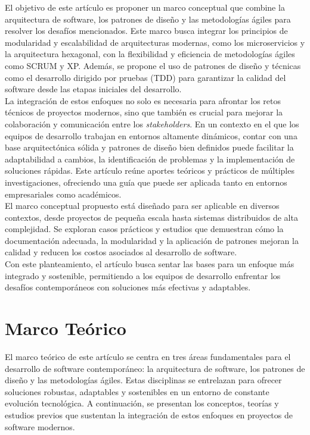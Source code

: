 \documentclass[conference]{IEEEtran}
\begin{document}
El objetivo de este artículo es proponer un marco conceptual que combine la arquitectura de software, los patrones de diseño y las metodologías ágiles para resolver los desafíos mencionados. Este marco busca integrar los principios de modularidad y escalabilidad de arquitecturas modernas, como los microservicios y la arquitectura hexagonal, con la flexibilidad y eficiencia de metodologías ágiles como SCRUM y XP. Además, se propone el uso de patrones de diseño y técnicas como el desarrollo dirigido por pruebas (TDD) para garantizar la calidad del software desde las etapas iniciales del desarrollo.\\

La integración de estos enfoques no solo es necesaria para afrontar los retos técnicos de proyectos modernos, sino que también es crucial para mejorar la colaboración y comunicación entre los \textit{stakeholders}. En un contexto en el que los equipos de desarrollo trabajan en entornos altamente dinámicos, contar con una base arquitectónica sólida y patrones de diseño bien definidos puede facilitar la adaptabilidad a cambios, la identificación de problemas y la implementación de soluciones rápidas. Este artículo reúne aportes teóricos y prácticos de múltiples investigaciones, ofreciendo una guía que puede ser aplicada tanto en entornos empresariales como académicos.\\

El marco conceptual propuesto está diseñado para ser aplicable en diversos contextos, desde proyectos de pequeña escala hasta sistemas distribuidos de alta complejidad. Se exploran casos prácticos y estudios que demuestran cómo la documentación adecuada, la modularidad y la aplicación de patrones mejoran la calidad y reducen los costos asociados al desarrollo de software.\\

Con este planteamiento, el artículo busca sentar las bases para un enfoque más integrado y sostenible, permitiendo a los equipos de desarrollo enfrentar los desafíos contemporáneos con soluciones más efectivas y adaptables.\\

\section{Marco Teórico}
El marco teórico de este artículo se centra en tres áreas fundamentales para el desarrollo de software contemporáneo: la arquitectura de software, los patrones de diseño y las metodologías ágiles. Estas disciplinas se entrelazan para ofrecer soluciones robustas, adaptables y sostenibles en un entorno de constante evolución tecnológica. A continuación, se presentan los conceptos, teorías y estudios previos que sustentan la integración de estos enfoques en proyectos de software modernos.\\
\end{document}
